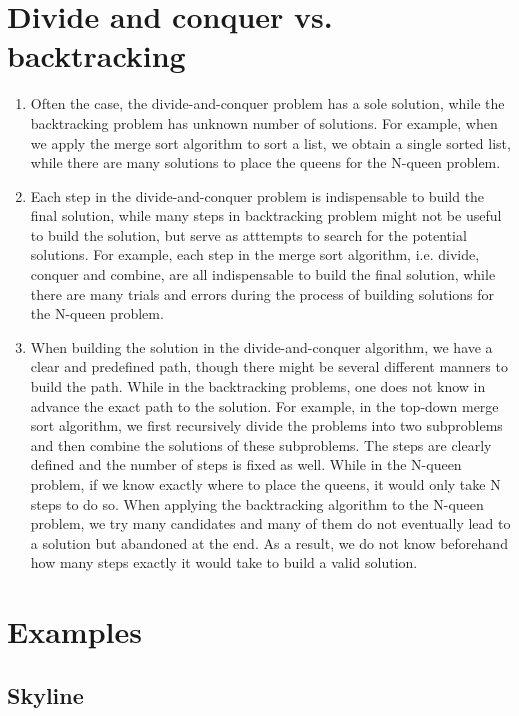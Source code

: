 \section{Divide and conquer vs. backtracking}
\begin{enumerate}
\item Often the case, the divide-and-conquer problem has a sole solution, while the backtracking problem has unknown number of solutions.
  For example, when we apply the merge sort algorithm to sort a list, we obtain a single sorted list, while there are many solutions to place the queens for the N-queen problem.
\item Each step in the divide-and-conquer problem is indispensable to build the final solution, while many steps in backtracking problem might not be useful to build the solution, but serve as atttempts to search for the potential solutions.
  For example, each step in the merge sort algorithm, i.e. divide, conquer and combine, are all indispensable to build the final solution, while there are many trials and errors during the process of building solutions for the N-queen problem.
\item When building the solution in the divide-and-conquer algorithm, we have a clear and predefined path, though there might be several different manners to build the path.
  While in the backtracking problems, one does not know in advance the exact path to the solution.
  For example, in the top-down merge sort algorithm, we first recursively divide the problems into two subproblems and then combine the solutions of these subproblems.
  The steps are clearly defined and the number of steps is fixed as well.
  While in the N-queen problem, if we know exactly where to place the queens, it would only take N steps to do so.
  When applying the backtracking algorithm to the N-queen problem, we try many candidates and many of them do not eventually lead to a solution but abandoned at the end.
  As a result, we do not know beforehand how many steps exactly it would take to build a valid solution. 
\end{enumerate}



\section{Examples}

\subsection{Skyline}

